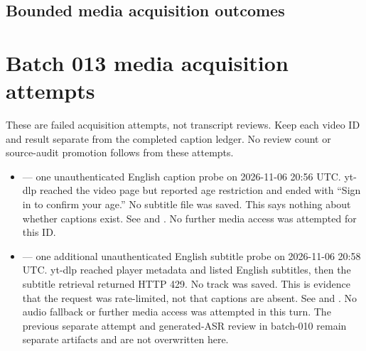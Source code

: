 \subsection{Bounded media acquisition outcomes}\label{appendix-877738f6f4d2-bounded-media-acquisition-outcomes}

\hypertarget{appendix-877738f6f4d2-bounded-media-acquisition-outcomes}{}

\section{Batch 013 media acquisition attempts}\label{appendix-877738f6f4d2-batch-013-media-acquisition-attempts}

\hypertarget{appendix-877738f6f4d2-batch-013-media-acquisition-attempts}{}

These are failed acquisition attempts, not transcript reviews. Keep each video ID and result separate from the completed caption ledger. No review count or source-audit promotion follows from these attempts.

\begin{itemize}
\tightlist
\item
   --- one unauthenticated English caption probe on 2026-11-06 20:56 UTC. yt-dlp reached the video page but reported age restriction and ended with ``Sign in to confirm your age.'' No subtitle file was saved. This says nothing about whether captions exist. See  and . No further media access was attempted for this ID.
\item
   --- one additional unauthenticated English subtitle probe on 2026-11-06 20:58 UTC. yt-dlp reached player metadata and listed English subtitles, then the subtitle retrieval returned HTTP 429. No track was saved. This is evidence that the request was rate-limited, not that captions are absent. See  and . No audio fallback or further media access was attempted in this turn. The previous separate attempt and generated-ASR review in batch-010 remain separate artifacts and are not overwritten here.
\end{itemize}

